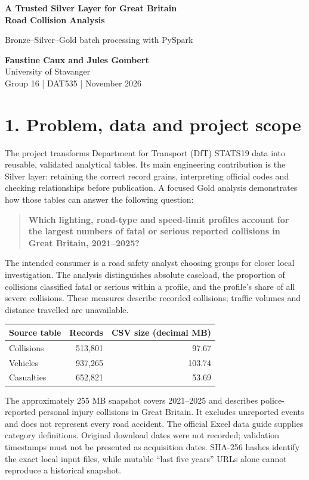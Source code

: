\documentclass[10pt,a4paper]{article}
\newcommand{\heading}[1]{\section*{\color{accent}#1}}
\begin{document}
\begin{center}
{\LARGE\bfseries A Trusted Silver Layer for Great Britain\\[4pt] Road Collision Analysis}\par
{\large Bronze--Silver--Gold batch processing with PySpark}\par
\textbf{Faustine Caux and Jules Gombert}\\[3pt]
University of Stavanger\\[3pt]
Group 16 \quad | \quad DAT535 \quad |  November 2026
\end{center}
\heading{1. Problem, data and project scope}
The project transforms Department for Transport (DfT) STATS19 data into reusable, validated analytical tables. Its main engineering contribution is the Silver layer: retaining the correct record grains, interpreting official codes and checking relationships before publication. A focused Gold analysis demonstrates how those tables can answer the following question:

\begin{quote}\bfseries Which lighting, road-type and speed-limit profiles account for the largest numbers of fatal or serious reported collisions in Great Britain, 2021--2025?\end{quote}

The intended consumer is a road safety analyst choosing groups for closer local investigation. The analysis distinguishes absolute caseload, the proportion of collisions classified fatal or serious within a profile, and the profile's share of all severe collisions. These measures describe recorded collisions; traffic volumes and distance travelled are unavailable.

\begin{center}
\begin{tabular}{lrr}
\toprule Source table & Records & CSV size (decimal MB)\\\midrule
Collisions & 513,801 & 97.67\\
Vehicles & 937,265 & 103.74\\
Casualties & 652,821 & 53.69\\\bottomrule
\end{tabular}
\end{center}

The approximately 255 MB snapshot covers 2021--2025 and describes police-reported personal injury collisions in Great Britain. It excludes unreported events and does not represent every road accident. The official Excel data guide supplies category definitions. Original download dates were not recorded; validation timestamps must not be presented as acquisition dates. SHA-256 hashes identify the exact local input files, while mutable ``last five years'' URLs alone cannot reproduce a historical snapshot.
\end{document}
